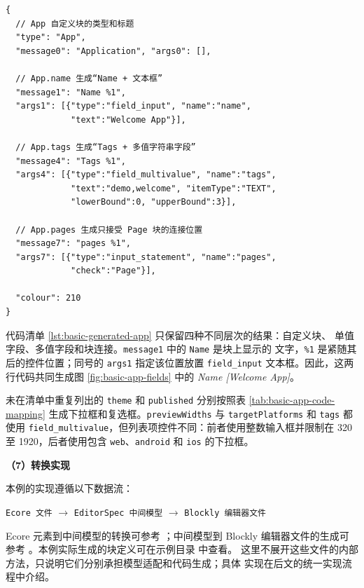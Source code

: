 \begin{enumerate}
\begin{lstlisting}[style=tfmjavascript, captionpos=t, caption={\texttt{App} 块生成代码的代表性片段}, label={lst:basic-generated-app}]
{
  // App 自定义块的类型和标题
  "type": "App",
  "message0": "Application", "args0": [],

  // App.name 生成“Name + 文本框”
  "message1": "Name %1",
  "args1": [{"type":"field_input", "name":"name",
             "text":"Welcome App"}],

  // App.tags 生成“Tags + 多值字符串字段”
  "message4": "Tags %1",
  "args4": [{"type":"field_multivalue", "name":"tags",
             "text":"demo,welcome", "itemType":"TEXT",
             "lowerBound":0, "upperBound":3}],

  // App.pages 生成只接受 Page 块的连接位置
  "message7": "pages %1",
  "args7": [{"type":"input_statement", "name":"pages",
             "check":"Page"}],

  "colour": 210
}
\end{lstlisting}

  代码清单 \ref{lst:basic-generated-app} 只保留四种不同层次的结果：自定义块、
  单值字段、多值字段和块连接。\texttt{message1} 中的 \texttt{Name} 是块上显示的
  文字，\texttt{\%1} 是紧随其后的控件位置；同号的 \texttt{args1} 指定该位置放置
  \texttt{field\_input} 文本框。因此，这两行代码共同生成图
  \ref{fig:basic-app-fields} 中的 \emph{Name [Welcome App]}。

  未在清单中重复列出的 \texttt{theme} 和 \texttt{published} 分别按照表
  \ref{tab:basic-app-code-mapping} 生成下拉框和复选框。\texttt{previewWidths}
  与 \texttt{targetPlatforms} 和 \texttt{tags} 都使用
  \texttt{field\_multivalue}，但列表项控件不同：前者使用整数输入框并限制在
  320 至 1920，后者使用包含 \texttt{web}、\texttt{android} 和 \texttt{ios}
  的下拉框。

  \textbf{（7）转换实现}

  本例的实现遵循以下数据流：

  \begin{center}
    \texttt{Ecore 文件}
    $\longrightarrow$
    \texttt{EditorSpec 中间模型}
    $\longrightarrow$
    \texttt{Blockly 编辑器文件}
  \end{center}

  Ecore 元素到中间模型的转换可参考
  ；中间模型到 Blockly 编辑器文件的生成可参考
  。本例实际生成的块定义可在示例目录
   中查看。
  这里不展开这些文件的内部方法，只说明它们分别承担模型适配和代码生成；具体
  实现在后文的统一实现流程中介绍。


\end{enumerate}
